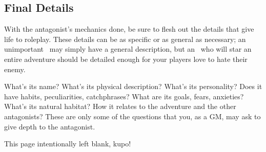 \begin{multicols}{2}
\subsection{Final Details}\label{gm-findet}
With the antagonist’s mechanics done, be sure to flesh out the details that give life to roleplay. These details can be as specific or as general as necessary; an unimportant \tmobmini{}\ may simply have a general description, but an \tmobleet{}\ who will star an entire adventure should be detailed enough for your players love to hate their enemy.

What's its name? What’s its physical description? What’s its personality? Does it have habits, peculiarities, catchphrases? What are its goals, fears, anxieties? What’s its natural habitat? How it relates to the adventure and the other antagonists? These are only some of the questions that you, as a GM, may ask to give depth to the antagonist.
\end{multicols}
\begin{center}
\end{center}

\clearpage
\begin{center}



    \textcolor{mogred}{\arabtype\LARGE This page intentionally left blank, kupo!}

\end{center}
